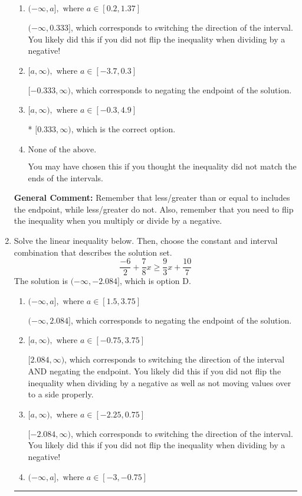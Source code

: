 \documentclass{extbook}[14pt]
\newcommand{\litem}[1]{\item #1

\rule{\textwidth}{0.4pt}}
\begin{document}
\begin{enumerate}
{\begin{enumerate}[label=\Alph*.]
 $(-\infty, -0.333]$, which corresponds to switching the direction of the interval AND negating the endpoint. You likely did this if you did not flip the inequality when dividing by a negative as well as not moving values over to a side properly.
\item \( (-\infty, a], \text{ where } a \in [0.2, 1.37] \)

 $(-\infty, 0.333]$, which corresponds to switching the direction of the interval. You likely did this if you did not flip the inequality when dividing by a negative!
\item \( [a, \infty), \text{ where } a \in [-3.7, 0.3] \)

 $[-0.333, \infty)$, which corresponds to negating the endpoint of the solution.
\item \( [a, \infty), \text{ where } a \in [-0.3, 4.9] \)

* $[0.333, \infty)$, which is the correct option.
\item \( \text{None of the above}. \)

You may have chosen this if you thought the inequality did not match the ends of the intervals.
\end{enumerate}

\textbf{General Comment:} Remember that less/greater than or equal to includes the endpoint, while less/greater do not. Also, remember that you need to flip the inequality when you multiply or divide by a negative.
}
\litem{
Solve the linear inequality below. Then, choose the constant and interval combination that describes the solution set.
\[ \frac{-6}{2} + \frac{7}{8} x \geq \frac{9}{3} x + \frac{10}{7} \]The solution is \( (-\infty, -2.084] \), which is option D.\begin{enumerate}[label=\Alph*.]
\item \( (-\infty, a], \text{ where } a \in [1.5, 3.75] \)

 $(-\infty, 2.084]$, which corresponds to negating the endpoint of the solution.
\item \( [a, \infty), \text{ where } a \in [-0.75, 3.75] \)

 $[2.084, \infty)$, which corresponds to switching the direction of the interval AND negating the endpoint. You likely did this if you did not flip the inequality when dividing by a negative as well as not moving values over to a side properly.
\item \( [a, \infty), \text{ where } a \in [-2.25, 0.75] \)

 $[-2.084, \infty)$, which corresponds to switching the direction of the interval. You likely did this if you did not flip the inequality when dividing by a negative!
\item \( (-\infty, a], \text{ where } a \in [-3, -0.75] \)


\end{enumerate}}
\end{enumerate}
\end{document}
